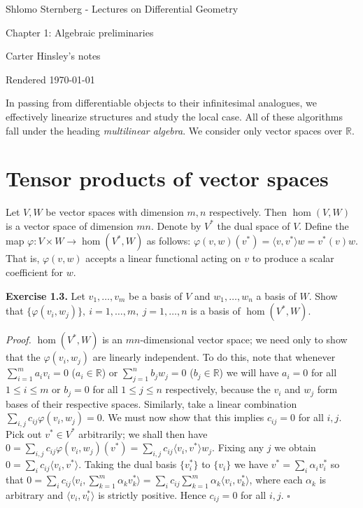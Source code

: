 \documentclass[a4paper]{article}
\newcommand{\R}{\mathbb{R}}
\begin{document}
\begin{center}
\LARGE{Shlomo Sternberg - Lectures on Differential Geometry}

\Large{Chapter 1: Algebraic preliminaries}

\large{Carter Hinsley's notes}

Rendered \today
\end{center}

In passing from differentiable objects to their infinitesimal analogues, we effectively linearize structures and study the local case. All of these algorithms fall under the heading \emph{multilinear algebra}. We consider only vector spaces over $\R$.

\section{Tensor products of vector spaces}

Let $V, W$ be vector spaces with dimension $m, n$ respectively. Then $\hom(V, W)$ is a vector space of dimension $mn$. Denote by $V^*$ the dual space of $V$. Define the map $\varphi : V \times W \to \hom(V^*, W)$ as follows: $\varphi(v, w)(v^*) = \langle v, v^* \rangle w = v^*(v) w$. That is, $\varphi(v, w)$ accepts a linear functional acting on $v$ to produce a scalar coefficient for $w$.

\textbf{Exercise 1.3.} Let $v_1, \ldots, v_m$ be a basis of $V$ and $w_1, \ldots, w_n$ a basis of $W$. Show that $\{\varphi(v_i, w_j)\},\ i = 1, \ldots, m,\ j = 1, \ldots, n$ is a basis of $\hom(V^*, W)$.

\emph{Proof.} $\hom(V^*, W)$ is an $mn$-dimensional vector space; we need only to show that the $\varphi(v_i, w_j)$ are linearly independent. To do this, note that whenever $\sum_{i=1}^m a_iv_i = 0$ ($a_i \in \R$) or $\sum_{j=1}^n b_jw_j = 0$ ($b_j \in \R$) we will have $a_i = 0$ for all $1 \leq i \leq m$ or $b_j = 0$ for all $1 \leq j \leq n$ respectively, because the $v_i$ and $w_j$ form bases of their respective spaces. Similarly, take a linear combination $\sum_{i, j} c_{ij} \varphi(v_i, w_j) = 0$. We must now show that this implies $c_{ij} = 0$ for all $i, j$. Pick out $v^* \in V^*$ arbitrarily; we shall then have $0 = \sum_{i, j} c_{ij}\varphi(v_i, w_j)(v^*) = \sum_{i, j} c_{ij}\langle v_i, v^* \rangle w_j$. Fixing any $j$ we obtain $0 = \sum_i c_{ij} \langle v_i, v^* \rangle$. Taking the dual basis $\{v_i^*\}$ to $\{v_i\}$ we have $v^* = \sum_i \alpha_iv_i^*$ so that $0 = \sum_i c_{ij} \langle v_i, \sum_{k=1}^m \alpha_k v_k^* \rangle = \sum_i c_{ij} \sum_{k=1}^m \alpha_k \langle v_i, v_k^* \rangle$, where each $\alpha_k$ is arbitrary and $\langle v_i, v_i^* \rangle$ is strictly positive. Hence $c_{ij} = 0$ for all $i, j$. $\square$
\end{document}
